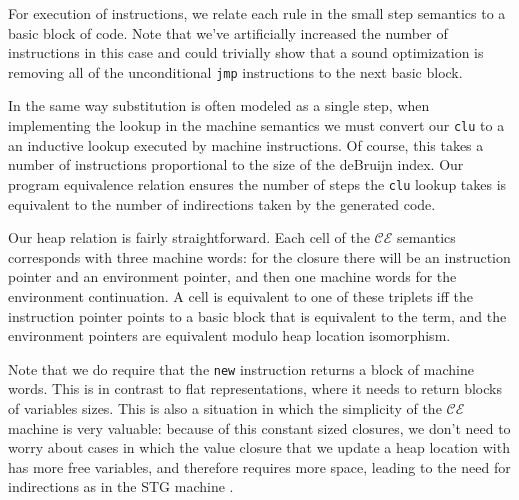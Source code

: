 For execution of instructions, we relate each rule in the small step semantics
to a basic block of code. Note that we've artificially increased the number of
instructions in this case and could trivially show that a sound optimization
is removing all of the unconditional \texttt{jmp} instructions to the next
basic block.  

In the same way substitution is often modeled as a single step, when
implementing the lookup in the machine semantics we must convert our
\texttt{clu} to a an inductive lookup executed by machine instructions. Of
course, this takes a number of instructions proportional to the size of the
deBruijn index. Our program equivalence relation ensures the number of steps
the \texttt{clu} lookup takes is equivalent to the number of indirections
taken by the generated code.

Our heap relation is fairly straightforward. Each cell of the $\mathcal{CE}$
semantics corresponds with three machine words: for the closure there will be an
instruction pointer and an environment pointer, and then one machine words for
the environment continuation. A cell is equivalent to one of these triplets iff
the instruction pointer points to a basic block that is equivalent to the term,
and the environment pointers are equivalent modulo heap location isomorphism.

Note that we do require that the \texttt{new} instruction returns a block of
machine words. This is in contrast to flat representations, where it needs to
return blocks of variables sizes. This is also a situation in which the
simplicity of the $\mathcal{CE}$ machine is very valuable: because of this
constant sized closures, we don't need to worry about cases in which the
value closure that we update a heap location with has more free variables, and
therefore requires more space, leading to the need for indirections as in the
STG machine \cite{STG}.


